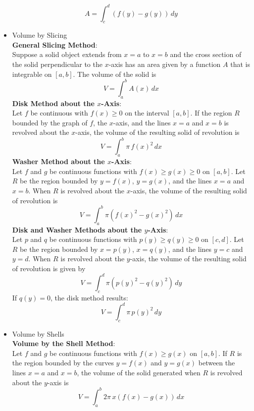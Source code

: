 \documentclass{article}
\begin{document}
\begin{itemize}
        $$A = \int_c^d{\left(f(y) - g(y)\right)\,dy}$$
    \item Volume by Slicing \\
        \textbf{General Slicing Method}: \\
        Suppose a solid object extends from $x = a$ to $x = b$ and the cross section of the solid perpendicular to the $x$-axis has an area given by a function $A$ that is integrable on $[a,b]$. The volume of the solid is
        $$V = \int_a^b{A(x)\,dx}$$
        \textbf{Disk Method about the $x$-Axis}: \\
        Let $f$ be continuous with $f(x) \geq 0$ on the interval $[a,b]$. If the region $R$ bounded by the graph of $f$, the $x$-axis, and the lines $x = a$ and $x = b$ is revolved about the $x$-axis, the volume of the resulting solid of revolution is
        $$V = \int_a^b{\pi\,f(x)^2\,dx}$$
        \textbf{Washer Method about the $x$-Axis}: \\
        Let $f$ and $g$ be continuous functions with $f(x) \geq g(x) \geq 0$ on $[a,b]$. Let $R$ be the region bounded by $y = f(x)$, $y = g(x)$, and the lines $x = a$ and $x = b$. When $R$ is revolved about the $x$-axis, the volume of the resulting solid of revolution is
        $$V = \int_a^b{\pi\left(f(x)^2 - g(x)^2\right)\,dx}$$
        \textbf{Disk and Washer Methods about the $y$-Axis}: \\
        Let $p$ and $q$ be continuous functions with $p(y) \geq q(y) \geq 0$ on $[c,d]$. Let $R$ be the region bounded by $x = p(y)$, $x = q(y)$, and the lines $y = c$ and $y = d$. When $R$ is revolved about the $y$-axis, the volume of the resulting solid of revolution is given by
        $$V = \int_c^d{\pi\left(p(y)^2 - q(y)^2\right)\,dy}$$
        If $q(y) = 0$, the disk method results:
        $$V = \int_c^d{\pi\,p(y)^2\,dy}$$
    \item Volume by Shells \\
        \textbf{Volume by the Shell Method}: \\
        Let $f$ and $g$ be continuous functions with $f(x) \geq g(x)$ on $[a,b]$. If $R$ is the region bounded by the curves $y = f(x)$ and $y = g(x)$ between the lines $x = a$ and $x = b$, the volume of the solid generated when $R$ is revolved about the $y$-axis is
        $$V = \int_a^b{2\pi\,x\left(f(x) - g(x)\right)\,dx}$$
\end{itemize}
\end{document}
